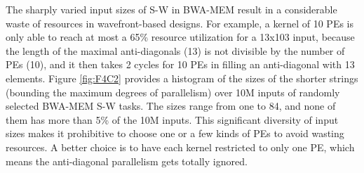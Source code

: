 The sharply varied input sizes of S-W in BWA-MEM result in a considerable waste of resources in wavefront-based designs. 
For example, a kernel of 10 PEs is only able to reach at most a 65\% resource utilization for a 13x103 input, because the length of the maximal anti-diagonals (13) is not divisible by the number of PEs (10), and it then takes 2 cycles for 10 PEs in filling an anti-diagonal with 13 elements.
Figure \ref{fig:F4C2} provides a histogram of the sizes of the shorter strings (bounding the maximum degrees of parallelism) over 10M inputs of randomly selected BWA-MEM S-W tasks. 
The sizes range from one to 84, and none of them has more than 5\% of the 10M inputs. 
This significant diversity of input sizes makes it prohibitive to choose one or a few kinds of PEs to avoid wasting resources.
A better choice is to have each kernel restricted to only one PE, which means the anti-diagonal parallelism gets totally ignored.


